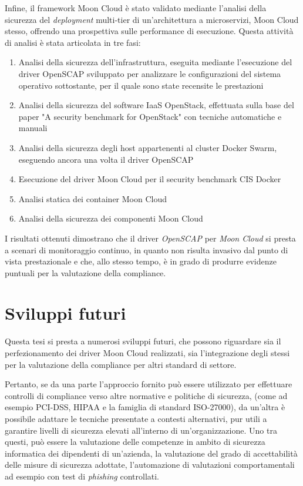\documentclass[../main.tex]{subfiles}
\begin{document}
Infine, il framework Moon Cloud è stato validato mediante l'analisi della sicurezza del \textit{deployment} multi-tier di un'architettura a microservizi, Moon Cloud stesso, offrendo una prospettiva sulle performance di esecuzione.
Questa attività di analisi è stata articolata in tre fasi:
\begin{enumerate}
    \item Analisi della sicurezza dell'infrastruttura, eseguita mediante l'esecuzione del driver OpenSCAP sviluppato per analizzare le configurazioni del sistema operativo sottostante, per il quale sono state recensite le prestazioni
    \item Analisi della sicurezza del software IaaS OpenStack, effettuata sulla base del paper "A security benchmark for OpenStack" con tecniche automatiche e manuali
    \item Analisi della sicurezza degli host appartenenti al cluster Docker Swarm, eseguendo ancora una volta il driver OpenSCAP
    \item Esecuzione del driver Moon Cloud per il security benchmark CIS Docker
    \item Analisi statica dei container Moon Cloud
    \item Analisi della sicurezza dei componenti Moon Cloud
\end{enumerate}

I risultati ottenuti dimostrano che il driver \textit{OpenSCAP} per \textit{Moon Cloud} si presta a scenari di monitoraggio continuo, in quanto non risulta invasivo dal punto di vista prestazionale e che, allo stesso tempo, è in grado di produrre evidenze puntuali per la valutazione della compliance.


\section {Sviluppi futuri}
Questa tesi si presta a numerosi sviluppi futuri, che possono riguardare sia il perfezionamento dei driver Moon Cloud realizzati, sia l'integrazione degli stessi per la valutazione della compliance per altri standard di settore.

Pertanto, se da una parte l'approccio fornito può essere utilizzato per effettuare controlli di compliance verso altre normative e politiche di sicurezza, (come ad esempio PCI-DSS, HIPAA e la famiglia di standard ISO-27000), da un'altra è possibile adattare le tecniche presentate a contesti alternativi, pur utili a garantire livelli di sicurezza elevati all'interno di un'organizzazione.
Uno tra questi, può essere la valutazione delle competenze in ambito di sicurezza informatica dei dipendenti di un'azienda, la valutazione del grado di accettabilità delle misure di sicurezza adottate, l'automazione di valutazioni comportamentali ad esempio con test di \textit{phishing} controllati.
\end{document}
